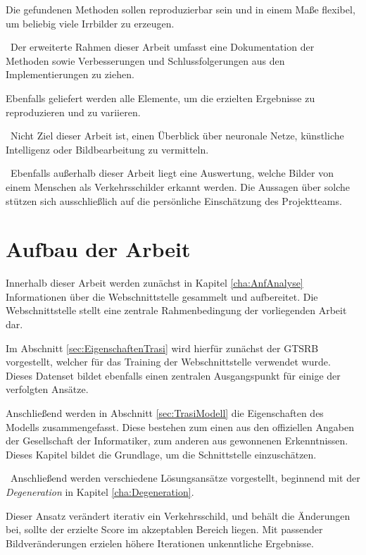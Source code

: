 Die gefundenen Methoden sollen reproduzierbar sein und in einem Maße flexibel, um beliebig viele Irrbilder zu erzeugen. 

~\newline Der erweiterte Rahmen dieser Arbeit umfasst eine Dokumentation der Methoden sowie Verbesserungen und Schlussfolgerungen aus den Implementierungen zu ziehen. 

Ebenfalls geliefert werden alle Elemente, um die erzielten Ergebnisse zu reproduzieren und zu variieren. 

~\newline Nicht Ziel dieser Arbeit ist, einen Überblick über neuronale Netze, künstliche Intelligenz oder Bildbearbeitung zu vermitteln. 

~\newline Ebenfalls außerhalb dieser Arbeit liegt eine Auswertung, welche Bilder von einem Menschen als Verkehrsschilder erkannt werden. Die Aussagen über solche stützen sich ausschließlich auf die persönliche Einschätzung des Projektteams. 
\section{Aufbau der Arbeit}
Innerhalb dieser Arbeit werden zunächst in Kapitel \ref{cha:AnfAnalyse} Informationen über die Webschnittstelle gesammelt und aufbereitet. Die Webschnittstelle stellt eine zentrale Rahmenbedingung der vorliegenden Arbeit dar.


Im Abschnitt \ref{sec:EigenschaftenTrasi} wird hierfür zunächst der \ac{GTSRB} vorgestellt, welcher für das Training der Webschnittstelle verwendet wurde. Dieses Datenset bildet ebenfalls einen zentralen Ausgangspunkt für einige der verfolgten Ansätze.


Anschließend werden in Abschnitt \ref{sec:TrasiModell} die Eigenschaften des Modells zusammengefasst. 
Diese bestehen zum einen aus den offiziellen Angaben der Gesellschaft der Informatiker, zum anderen aus gewonnenen Erkenntnissen. Dieses Kapitel bildet die Grundlage, um die Schnittstelle einzuschätzen. 

~\newline Anschließend werden verschiedene Lösungsansätze vorgestellt, beginnend mit der \textit{Degeneration} in Kapitel \ref{cha:Degeneration}. 

Dieser Ansatz verändert iterativ ein Verkehrsschild, und behält die Änderungen bei, sollte der erzielte Score im akzeptablen Bereich liegen. Mit passender Bildveränderungen erzielen höhere Iterationen unkenntliche Ergebnisse. 

